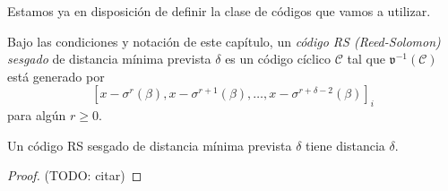 Estamos ya en disposición de definir la clase de códigos que vamos a utilizar.

\begin{definition}
  Bajo las condiciones y notación de este capítulo, un \emph{código RS (Reed-Solomon) sesgado} de distancia mínima prevista \(\delta\) es un código cíclico \(\mathcal C\) tal que \(\mathfrak v^{-1}(\mathcal C)\) está generado por 
  \[
    \left[x - \sigma^r(\beta), x - \sigma^{r+1}(\beta), \dots, x - \sigma^{r+\delta-2}(\beta)\right]_i
  \] 
  para algún \(r \geq 0\).
\end{definition}

\begin{theorem}
  Un código RS sesgado de distancia mínima prevista \(\delta\) tiene distancia \(\delta\).
\end{theorem}

\begin{proof}
  (TODO: citar)
\end{proof}